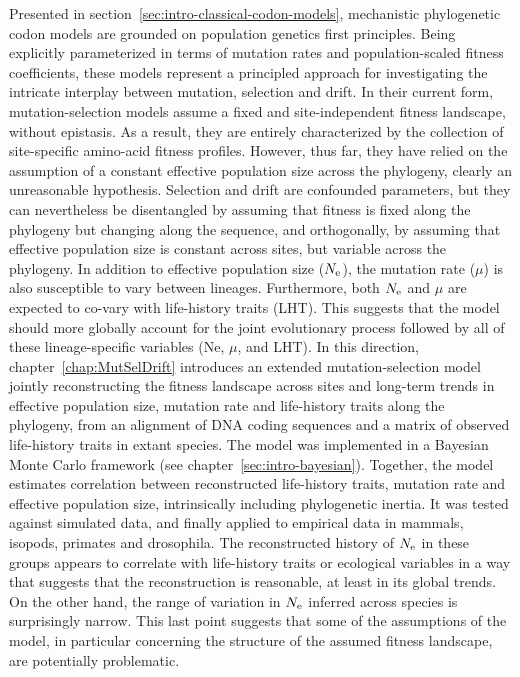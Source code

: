 Presented in section~\ref{sec:intro-classical-codon-models}, mechanistic phylogenetic codon models are grounded on population genetics first principles.
Being explicitly parameterized in terms of mutation rates and population-scaled fitness coefficients, these models represent a principled approach for investigating the intricate interplay between mutation, selection and drift.
In their current form, mutation-selection models assume a fixed and site-independent fitness landscape, without epistasis.
As a result, they are entirely characterized by the collection of site-specific amino-acid fitness profiles.
However, thus far, they have relied on the assumption of a constant effective population size across the phylogeny, clearly an unreasonable hypothesis.
Selection and drift are confounded parameters, but they can nevertheless be disentangled by assuming that fitness is fixed along the phylogeny but changing along the sequence, and orthogonally, by assuming that effective population size is constant across sites, but variable across the phylogeny.
In addition to effective population size ($N_{\textrm{e}}$), the mutation rate ($\mu$) is also susceptible to vary between lineages.
Furthermore, both $N_{\textrm{e}}$ and $\mu$ are expected to co-vary with life-history traits (LHT).
This suggests that the model should more globally account for the joint evolutionary process followed by all of these lineage-specific variables (Ne, $\mu$, and LHT).
In this direction, chapter~\ref{chap:MutSelDrift} introduces an extended mutation-selection model jointly reconstructing the fitness landscape across sites and long-term trends in effective population size, mutation rate and life-history traits along the phylogeny, from an alignment of DNA coding sequences and a matrix of observed life-history traits in extant species.
The model was implemented in a Bayesian Monte Carlo framework (see chapter~\ref{sec:intro-bayesian}).
Together, the model estimates correlation between reconstructed life-history traits, mutation rate and effective population size, intrinsically including phylogenetic inertia.
It was tested against simulated data, and finally applied to empirical data in mammals, isopods, primates and drosophila.
The reconstructed history of $N_{\textrm{e}}$ in these groups appears to correlate with life-history traits or ecological variables in a way that suggests that the reconstruction is reasonable, at least in its global trends.
On the other hand, the range of variation in $N_{\textrm{e}}$ inferred across species is surprisingly narrow.
This last point suggests that some of the assumptions of the model, in particular concerning the structure of the assumed fitness landscape, are potentially problematic.


